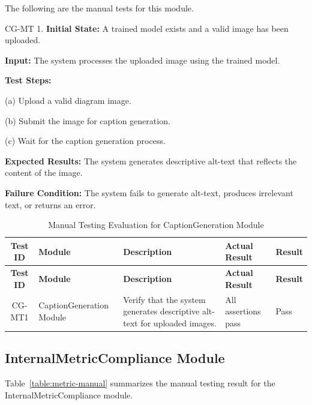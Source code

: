 \documentclass[12pt, titlepage]{article}
\begin{document}
The following are the manual tests for this module.

CG-MT 1. \textbf{Initial State:} A trained model exists and a valid
image has been uploaded.

\textbf{Input:} The system processes the uploaded image using the trained model.

\textbf{Test Steps:}

(a) Upload a valid diagram image.

(b) Submit the image for caption generation.

(c) Wait for the caption generation process.

\textbf{Expected Results:} The system generates descriptive alt-text
that reflects the content of the image.

\textbf{Failure Condition:} The system fails to generate alt-text,
produces irrelevant text, or returns an error.

\begin{longtable}{@{}c
    >{\raggedright\arraybackslash}p{4.0cm}
    >{\raggedright\arraybackslash}p{4.5cm}
    >{\raggedright\arraybackslash}p{3.6cm}
  >{\centering\arraybackslash}p{1.2cm}@{}}

  \caption{Manual Testing Evaluation for CaptionGeneration
  Module}\label{table:captiongen-manual}\\
  \toprule
  \textbf{Test ID} & \textbf{Module} & \textbf{Description} &
  \textbf{Actual Result} & \textbf{Result} \\
  \midrule
  \endfirsthead

  \toprule
  \textbf{Test ID} & \textbf{Module} & \textbf{Description} &
  \textbf{Actual Result} & \textbf{Result} \\
  \midrule
  \endhead

  \bottomrule
  \endlastfoot

  CG-MT1 & CaptionGeneration Module &
  Verify that the system generates descriptive alt-text for uploaded images. &
  All assertions pass &
  \cellcolor{green}Pass \\

\end{longtable}

\subsection{InternalMetricCompliance Module}
Table~\ref{table:metric-manual} summarizes the manual testing result
for the InternalMetricCompliance module.
\end{document}
